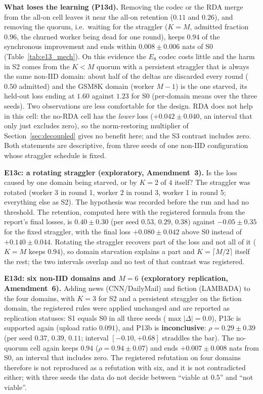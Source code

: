 \documentclass[11pt,a4paper]{article}
\begin{document}
\textbf{What loses the learning (P13d).} Removing the codec or the RDA merge from the all-on cell leaves it near the all-on retention ($0.11$ and $0.26$), and removing the quorum, i.e.\ waiting for the straggler ($K=M$, admitted fraction $0.96$, the churned worker being dead for one round), keeps $0.94$ of the synchronous improvement and ends within $0.008 \pm 0.006$ nats of S0 (Table~\ref{tab:e13_mech}). On this evidence the $E_8$ codec costs little and the harm in S2 comes from the $K<M$ quorum with a persistent straggler that is always the same non-IID domain: about half of the deltas are discarded every round ($0.50$ admitted) and the GSM8K domain (worker $M{-}1$) is the one starved, its held-out loss ending at $1.60$ against $1.23$ for S0 (per-domain means over the three seeds). Two observations are less comfortable for the design. RDA does not help in this cell: the no-RDA cell has the \emph{lower} loss ($+0.042 \pm 0.040$, an interval that only just excludes zero), so the norm-restoring multiplier of Section~\ref{sec:decoupled} gives no benefit here; and the S3 contrast includes zero. Both statements are descriptive, from three seeds of one non-IID configuration whose straggler schedule is fixed.

\textbf{E13c: a rotating straggler (exploratory, Amendment~3).} Is the loss caused by one domain being starved, or by $K=2$ of $4$ itself? The straggler was rotated (worker 3 in round 1, worker 2 in round 3, worker 1 in round 5; everything else as S2). The hypothesis was recorded before the run and had no threshold. The retention, computed here with the registered formula from the report's final losses, is $0.40 \pm 0.30$ (per seed $0.53$, $0.29$, $0.38$) against $-0.05 \pm 0.35$ for the fixed straggler, with the final loss $+0.080 \pm 0.042$ above S0 instead of $+0.140 \pm 0.044$. Rotating the straggler recovers part of the loss and not all of it ($K=M$ keeps $0.94$), so domain starvation explains a part and $K=\lceil M/2\rceil$ itself the rest; the two intervals overlap and no test of that contrast was registered.

\textbf{E13d: six non-IID domains and $M=6$ (exploratory replication, Amendment~6).} Adding news (CNN/DailyMail) and fiction (LAMBADA) to the four domains, with $K=3$ for S2 and a persistent straggler on the fiction domain, the registered rules were applied unchanged and are reported as replication statuses: S1 equals S0 in all three seeds ($\max|\Delta|=0.0$), P13c is supported again (upload ratio $0.091$), and P13b is \textbf{inconclusive}: $\rho = 0.29 \pm 0.39$ (per seed $0.37$, $0.39$, $0.11$; interval $[-0.10, +0.68]$ straddles the bar). The no-quorum cell again keeps $0.94$ ($\rho = 0.94 \pm 0.07$) and ends $+0.007 \pm 0.008$ nats from S0, an interval that includes zero. The registered refutation on four domains therefore is not reproduced as a refutation with six, and it is not contradicted either; with three seeds the data do not decide between ``viable at $0.5$'' and ``not viable''.
\end{document}
